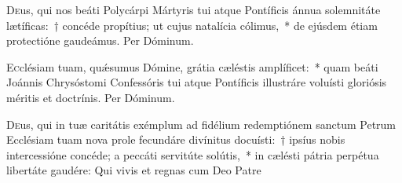 \documentclass[vesperale_romanum.tex]{subfiles}
\begin{document}
\oratio

 \lettrine{D}{e}us, qui nos beáti Polycárpi Mártyris tui atque Pontíficis ánnua sole\-mnitáte lætíficas:~† concéde propítius; ut cujus natalícia cólimus,~* de ejúsdem étiam prote\-ctióne gaudeámus. Per Dóminum.
 
 \capitdeseq

\myrule


\duplexmtv


\oratio

\lettrine{E}{c}clésiam tuam, quǽsumus Dómine, grátia cæléstis amplíficet:~* quam beáti Joánnis Chrysóstomi Confessóris tui atque Pontíficis illustráre voluísti gloriósis méritis et do\-ctrínis. Per Dóminum.



\myrule


\duplexmtv


\oratio

 \lettrine{D}{e}us, qui in tuæ caritátis exémplum ad fidélium red\-em\-ptiónem sanctum Petrum Ecclésiam tuam nova prole fecundáre divínitus docuísti:~† i\-psíus nobis intercessióne concéde; a peccáti servitúte solútis,~* in cælésti pátria perpétua libertáte gaudére:
Qui vivis et regnas cum Deo Patre






\end{document}
